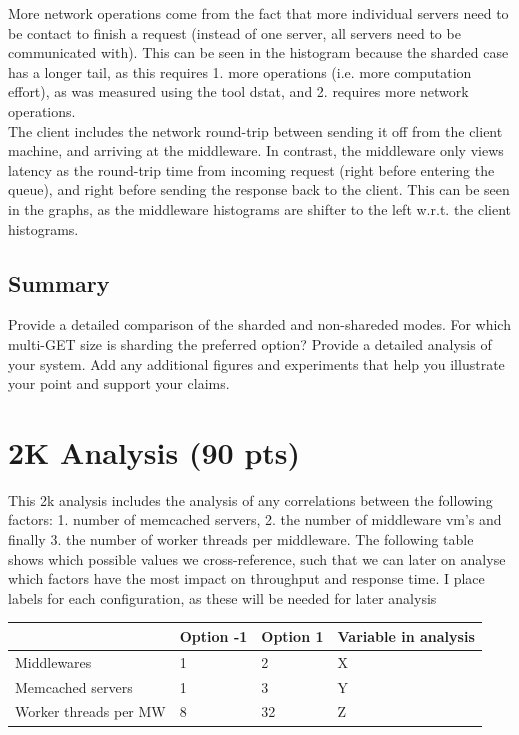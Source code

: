 \documentclass[11pt,a4paper]{article}
\begin{document}

More network operations come from the fact that more individual servers need to be contact to finish a request (instead of one server, all servers need to be communicated with).
This can be seen in the histogram because the sharded case has a longer tail, as this requires 1. more operations (i.e. more computation effort), as was measured using the tool dstat, and 2. requires more network operations. \\

The client includes the network round-trip between sending it off from the client machine, and arriving at the middleware.
In contrast, the middleware only views latency as the round-trip time from incoming request (right before entering the queue), and right before sending the response back to the client.
This can be seen in the graphs, as the middleware histograms are shifter to the left w.r.t. the client histograms.


\subsection{Summary}

Provide a detailed comparison of the sharded and non-shareded modes. For which multi-GET size is sharding the preferred option? Provide a detailed analysis of your system. Add any additional figures and experiments that help you illustrate your point and support your claims.

\section{2K Analysis (90 pts)}

This 2k analysis includes the analysis of any correlations between the following factors: 1. number of memcached servers, 2. the number of middleware vm's and finally 3. the number of worker threads per middleware.
The following table shows which possible values we cross-reference, such that we can later on analyse which factors have the most impact on throughput and response time.
I place labels for each configuration, as these will be needed for later analysis

\begin{center}
    \begin{tabular}{ | l | l | l | p{5cm} |}
    \hline
     & Option -1 & Option 1 & Variable in analysis \\ \hline
     Middlewares & 1 & 2 & X \\ \hline
    Memcached servers & 1 & 3 & Y \\ \hline
    Worker threads per MW & 8 & 32 & Z \\
    \hline
    \end{tabular}
\end{center}
\end{document}
